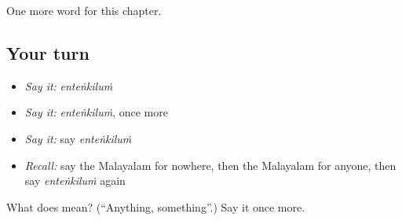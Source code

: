 \begin{grammarlens}[title={What you've built}]
One more word for this chapter.
\end{grammarlens}

\subsection*{Your turn}
\begin{itemize}
\raggedright
  \item \emph{Say it:} \emph{enteṅkiluṁ}
  \item \emph{Say it:} \emph{enteṅkiluṁ}, once more
  \item \emph{Say it:} say \emph{enteṅkiluṁ}
  \item \emph{Recall:} say the Malayalam for nowhere, then the Malayalam for anyone, then say \emph{enteṅkiluṁ} again
\end{itemize}

\begin{tcolorbox}[breakable,colback=teal!4,colframe=teal!35!black,title={Before you move on}]
What does  mean? (\textquotedblleft{}Anything, something\textquotedblright{}.) Say it once more.
\end{tcolorbox}
